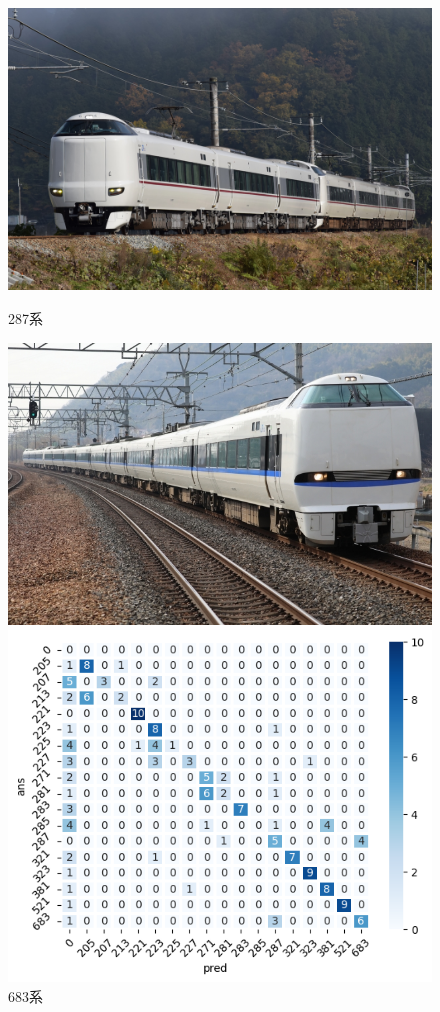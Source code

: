 \newpage
\begin{figure}[htbp]
	\begin{minipage}[b]{0.2\linewidth}
		\centering
		\includegraphics[width=\linewidth]{fig/287.jpg}
		\caption{287系}
	\end{minipage}
	\begin{minipage}[b]{0.2\linewidth}
		\centering
		\includegraphics[width=\linewidth]{fig/683.jpg}
		\caption{683系}
	\end{minipage}
    \begin{minipage}[b]{0.5\linewidth}
		\centering
		\includegraphics[width=\linewidth]{../paper/chap4/fig/predicted_results}

\end{minipage}
\end{figure}
